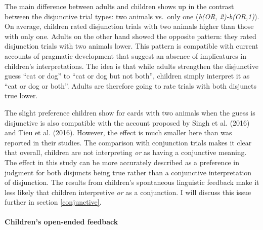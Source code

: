 \documentclass[man]{apa6}
\theoremstyle{definition}
\theoremstyle{definition}
\theoremstyle{definition}
\theoremstyle{remark}
\begin{document}
The main difference between adults and children shows up in the contrast
between the disjunctive trial types: two animals vs.~only one
(\emph{b(OR, 2)-b(OR,1)}). On average, children rated disjunction trials
with two animals higher than those with only one. Adults on the other
hand showed the opposite pattern: they rated disjunction trials with two
animals lower. This pattern is compatible with current accounts of
pragmatic development that suggest an absence of implicatures in
children's interpretations. The idea is that while adults strengthen the
disjunctive guess \enquote{cat or dog} to \enquote{cat or dog but not
both}, children simply interpret it as \enquote{cat or dog or both}.
Adults are therefore going to rate trials with both disjuncts true
lower.

The slight preference children show for cards with two animals when the
guess is disjunctive is also compatible with the account proposed by
Singh et al. (2016) and Tieu et al. (2016). However, the effect is much
smaller here than was reported in their studies. The comparison with
conjunction trials makes it clear that overall, children are not
interpreting \emph{or} as having a conjunctive meaning. The effect in
this study can be more accurately described as a preference in judgment
for both disjuncts being true rather than a conjunctive interpretation
of disjunction. The results from children's spontaneous linguistic
feedback make it less likely that children interpretive \emph{or} as a
conjunction. I will discuss this issue further in section
\ref{conjunctive}.

\paragraph{Children's open-ended
feedback}\label{childrens-open-ended-feedback}
\end{document}
